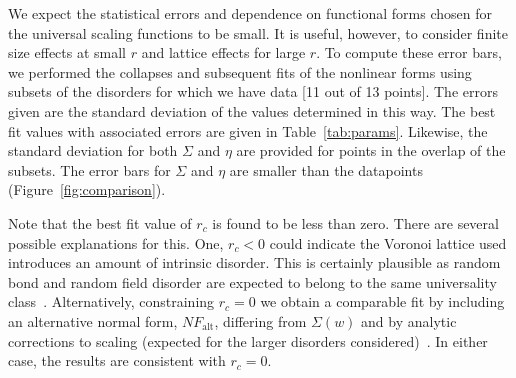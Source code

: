 \documentclass[reprint,amsmath,amssymb,aps,floatfix, prl]{revtex4-1}
\begin{document}
%
We expect the statistical errors and dependence on functional forms chosen for the universal scaling functions to be small. It is useful, however, to consider finite size effects at small $r$ and lattice effects for large $r$.  To compute these error bars,  we performed the collapses and subsequent fits of the nonlinear forms using subsets of the disorders for which we have data [11 out of 13 points]. The errors given are the standard deviation of the values determined in this way. The best fit values with associated errors are given in Table~\ref{tab:params}. Likewise, the standard deviation for both $\Sigma$ and $\eta$ are provided for points in the overlap of the subsets. The error bars for $\Sigma$ and $\eta$ are smaller than the datapoints (Figure~\ref{fig:comparison}). \par
%
Note that the best fit value of $r_c$ is found to be less than zero. There are several possible explanations for this. One, $r_c<0$ could indicate the Voronoi lattice used introduces an amount of intrinsic disorder. This is certainly plausible as random bond and random field disorder are expected to belong to the same universality class~\cite{Dahmen96, Vives95}. Alternatively, constraining $r_c=0$ we obtain a comparable fit by including an alternative normal form, $NF_{\textrm{alt}}$, differing from $\Sigma(w)$ and by analytic corrections to scaling (expected for the larger disorders considered)~\cite[Section~\ref{supp-app:well-behaved}]{RFIM2Dsupp}. In either case, the results are consistent with $r_c=0.$ \par
%
\end{document}
